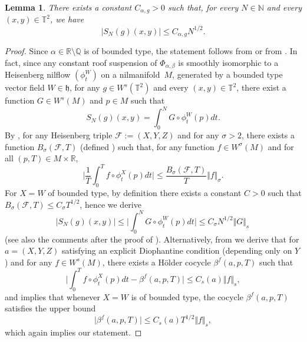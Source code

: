 \documentclass[10pt]{amsart}
\let\mathcal\mathscr
\theoremstyle{definition}
\theoremstyle{plain}
\newtheorem{lemma}[definition]{Lemma}
\newcommand\NN{\mathbb{N}}
\newcommand\QQ{\mathbb{Q}}
\newcommand\RR{\mathbb{R}}
\newcommand\TT{\mathbb{T}}
\begin{document}
\begin{lemma}\label{lem:upperbound} There exists a constant $C_{\alpha,g}>0$ such that, for every $N\in \NN$ and every $(x,y)\in \TT^2$, we have
\[
|S_{N}(g)(x,y)|\leq C_{\alpha,g}N^{1/2}.
\]
\end{lemma}
\begin{proof} Since $\alpha\in \RR\setminus \QQ$ is of bounded type, the statement follows from \cite[Lem.\,1.4.9]{FoSurvey} or from \cite[Lem.\,6.1 \& Th.\,6.2]{FK}.
In fact, since any constant roof suspension of $\Phi_{\alpha,\beta}$ is smoothly isomorphic to a Heisenberg nilflow $(\phi^W_t)$ on a nilmanifold~$M$, generated by a bounded type vector field $W\in \mathfrak h$, for any $g\in W^s(\TT^2)$ and every $(x,y)\in \TT^2$, there exist a function $G\in W^s(M)$ and $p\in M$ such that
\[
S_{N}(g)(x,y)= \int_0^N G\circ \phi^W_t(p) dt.
\]
By \cite[Lem.\,1.4.9]{FoSurvey}, for any Heisenberg triple $\mathcal F:=(X,Y,Z)$ and for any $\sigma>2$, there exists a function $B_\sigma(\mathcal F,T)$ (defined \cite[Eq.\,(1.71)]{FoSurvey}) such that, for any function $f\in W^\sigma(M)$ and for all $(p,T)\in M\times \RR$,
\[
\biggl\vert \frac{1}{T} \int_0^T f\circ \phi^X_t(p) dt \biggr\vert \leq \frac{ B_\sigma(\mathcal F,T)}{T} \Vert f\Vert_\sigma.
\]
For $X=W$ of bounded type, by definition there exists a constant $C>0$ such that $B_\sigma(\mathcal F,T) \leq C_\sigma T^{1/2}$, hence we derive
\[
\vert S_{N}(g)(x,y) \vert \leq \biggl\vert \int_0^N G\circ \phi^W_t(p) dt \biggr\vert \leq C_\sigma N^{1/2} \Vert G\Vert_s\,
\]
(see also the comments after the proof of \cite[Lem.\,1.4.9]{FoSurvey}). Alternatively, from \cite[Th.\,6.2]{FK} we derive that for
$a=(X,Y,Z)$ satisfying an explicit Diophantine condition (depending only on $Y$) and for any $f\in W^s(M)$, there exists a Hölder cocycle $\beta^f (a, p,T)$ such that
\[
\biggl\vert \int_0^T f\circ \phi^X_t(p) dt - \beta^f (a,p,T)\biggr\vert \leq C_s(a) \Vert f \Vert_s,
\]
and \cite[Lem.\,6.1]{FK} implies that whenever $X=W$ is of bounded type, the cocycle $\beta^f (a, p,T)$ satisfies the upper bound
\[
\vert \beta^f (a, p,T) \vert \leq C_s (a) T^{1/2} \Vert f \Vert_s,
\]
which again implies our statement.
\end{proof}
\end{document}
